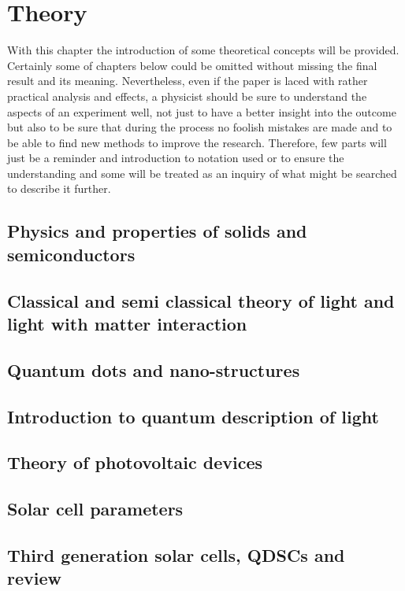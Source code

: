 \chapter{Theory}

With this chapter the introduction of some theoretical concepts will be provided. Certainly some of chapters below could be omitted without missing the final result and its meaning. Nevertheless, even if the paper is laced with rather practical analysis and effects, a physicist should be sure to understand the aspects of an experiment well, not just to have a better insight into the outcome but also to be sure that during the process no foolish mistakes are made and to be able to find new methods to improve the research. Therefore, few parts will just be a reminder and introduction to notation used or to ensure the understanding and some will be treated as an inquiry of what might be searched to describe it further. 

\section{Physics and properties of solids and semiconductors}

\section{Classical and semi classical theory of light and light with matter interaction}

\section{Quantum dots and nano-structures}

\section{Introduction to quantum description of light}

\section{Theory of photovoltaic devices}

\section{Solar cell parameters}

\section{Third generation solar cells, QDSCs and review}
